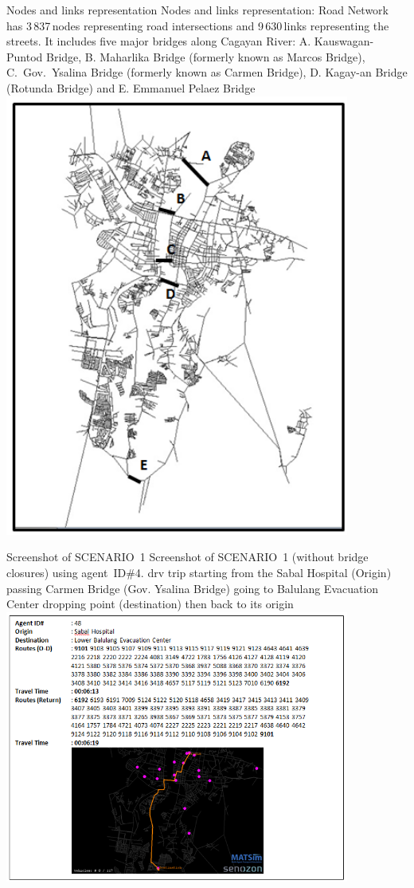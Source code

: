 \createfigure%
{Nodes and links representation}%
{Nodes and links representation: Road Network has 3\,837\,nodes representing road intersections and 9\,630\,links representing the streets. It includes five major bridges along Cagayan River: A. Kauswagan-Puntod Bridge, B. Maharlika Bridge (formerly known as Marcos Bridge), C.\ Gov.\ Ysalina Bridge (formerly known as Carmen Bridge), D. Kagay-an Bridge (Rotunda Bridge) and E. Emmanuel Pelaez Bridge}%
{\label{fig:philippines_fig2}}%
{\includegraphics[width=0.85\textwidth, angle=0]{./scenarios/figures/philippines_fig2.png}}%
{}

\createfigure%
{Screenshot of SCENARIO~1}%
{Screenshot of SCENARIO~1 (without bridge closures) using agent~ID\#4. \protect\gls{drv} trip starting from the Sabal Hospital (Origin) passing Carmen Bridge (Gov. Ysalina Bridge) going to Balulang Evacuation Center dropping point (destination) then back to its origin}%
{\label{fig:philippines_fig4}}%
{\includegraphics[width=0.85\textwidth, angle=0]{./scenarios/figures/philippines_fig4.png}}%
{}

